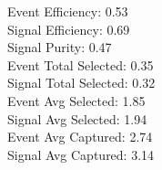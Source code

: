 Event  Efficiency:     0.53\\
Signal Efficiency:     0.69\\
Signal Purity:         0.47\\
Event  Total Selected: 0.35\\
Signal Total Selected: 0.32\\
Event  Avg Selected:   1.85\\
Signal Avg Selected:   1.94\\
Event  Avg Captured:   2.74\\
Signal Avg Captured:   3.14